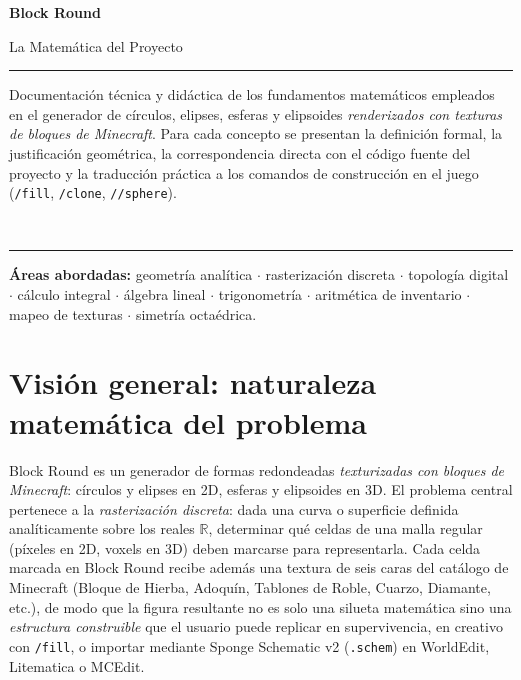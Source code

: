 \documentclass[12pt,a4paper]{scrartcl}
\newcommand{\code}[1]{\texttt{\small #1}}
\newcommand{\cmd}[1]{\textcolor{earth}{\texttt{\small #1}}}
\begin{document}
\begin{titlepage}
  \centering
  \vspace*{3.5cm}
  {\sffamily\bfseries\fontsize{56}{60}\selectfont \color{accent} Block Round\par}
  \vspace{0.7cm}
  {\sffamily\LARGE\color{muted} La Matemática del Proyecto\par}
  \vspace{1.4cm}
  {\color{rule}\rule{0.6\textwidth}{0.6pt}\par}
  \vspace{0.9cm}
  \begin{minipage}{0.82\textwidth}
    \centering\color{ink}\large
    Documentación técnica y didáctica de los fundamentos matemáticos empleados en el generador de círculos, elipses, esferas y elipsoides \emph{renderizados con texturas de bloques de Minecraft}. Para cada concepto se presentan la definición formal, la justificación geométrica, la correspondencia directa con el código fuente del proyecto y la traducción práctica a los comandos de construcción en el juego (\cmd{/fill}, \cmd{/clone}, \cmd{//sphere}).
  \end{minipage}
  \vspace{0.9cm}\\
  {\color{rule}\rule{0.6\textwidth}{0.6pt}\par}
  \vspace{2cm}
  \begin{minipage}{0.78\textwidth}
    \centering\sffamily\small\color{muted}
    \textbf{Áreas abordadas:} geometría analítica $\cdot$ rasterización discreta $\cdot$ topología digital $\cdot$ cálculo integral $\cdot$ álgebra lineal $\cdot$ trigonometría $\cdot$ aritmética de inventario $\cdot$ mapeo de texturas $\cdot$ simetría octaédrica.
  \end{minipage}
\end{titlepage}

\renewcommand{\contentsname}{\color{accent}Índice}
\tableofcontents
\thispagestyle{fancy}
\newpage

\section{Visión general: naturaleza matemática del problema}

Block Round es un generador de formas redondeadas \emph{texturizadas con bloques de Minecraft}: círculos y elipses en 2D, esferas y elipsoides en 3D. El problema central pertenece a la \emph{rasterización discreta}: dada una curva o superficie definida analíticamente sobre los reales $\mathbb{R}$, determinar qué celdas de una malla regular (píxeles en 2D, voxels en 3D) deben marcarse para representarla. Cada celda marcada en Block Round recibe además una textura de seis caras del catálogo de Minecraft (Bloque de Hierba, Adoquín, Tablones de Roble, Cuarzo, Diamante, etc.), de modo que la figura resultante no es solo una silueta matemática sino una \emph{estructura construible} que el usuario puede replicar en supervivencia, en creativo con \cmd{/fill}, o importar mediante Sponge Schematic v2 (\code{.schem}) en WorldEdit, Litematica o MCEdit.
\end{document}
